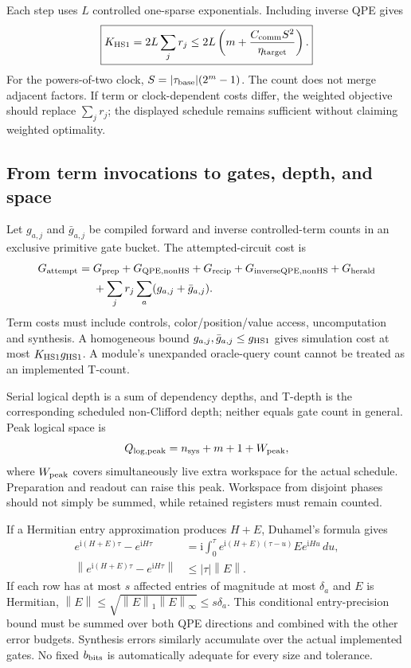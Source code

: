 \documentclass[11pt,a4paper]{article}
\newcommand{\norm}[1]{\left\lVert #1\right\rVert}
\newcommand{\C}{C_{\mathrm{comm}}}
\newcommand{\HS}{K_{\mathrm{HS1}}}
\newcommand{\ip}{\mathrm{i}}
\begin{document}
Each step uses $L$ controlled one-sparse exponentials. Including inverse QPE gives
\begin{equation}\label{eq:count}
 \boxed{\HS=2L\sum_jr_j\leq2L\left(m+\frac{\C S^2}{\eta_{\rm target}}\right).}
\end{equation}
For the powers-of-two clock, $S=|\tau_{\rm base}|(2^m-1)$. The count does not merge adjacent factors. If term or clock-dependent costs differ, the weighted objective should replace $\sum_jr_j$; the displayed schedule remains sufficient without claiming weighted optimality.

\subsection{From term invocations to gates, depth, and space}
Let $g_{a,j}$ and $\bar g_{a,j}$ be compiled forward and inverse controlled-term counts in an exclusive primitive gate bucket. The attempted-circuit cost is
\begin{align}
 G_{\rm attempt}={}&G_{\rm prep}+G_{\rm QPE,nonHS}+G_{\rm recip}
 +G_{\rm inverseQPE,nonHS}+G_{\rm herald}\nonumber\\
 &+\sum_jr_j\sum_a(g_{a,j}+\bar g_{a,j}).
\end{align}
Term costs must include controls, color/position/value access, uncomputation and synthesis. A homogeneous bound $g_{a,j},\bar g_{a,j}\leq g_{\rm HS1}$ gives simulation cost at most $\HS g_{\rm HS1}$. A module's unexpanded oracle-query count cannot be treated as an implemented T-count.

Serial logical depth is a sum of dependency depths, and T-depth is the corresponding scheduled non-Clifford depth; neither equals gate count in general. Peak logical space is
\begin{equation}
 Q_{\rm log,peak}=n_{\rm sys}+m+1+W_{\rm peak},
\end{equation}
where $W_{\rm peak}$ covers simultaneously live extra workspace for the actual schedule. Preparation and readout can raise this peak. Workspace from disjoint phases should not simply be summed, while retained registers must remain counted.

If a Hermitian entry approximation produces $H+E$, Duhamel's formula gives
\begin{align}
 e^{\ip(H+E)\tau}-e^{\ip H\tau}
 &=\ip\int_0^\tau e^{\ip(H+E)(\tau-u)}E e^{\ip Hu}\,du,\\
 \norm{e^{\ip(H+E)\tau}-e^{\ip H\tau}}&\leq|\tau|\norm E.
\end{align}
If each row has at most $s$ affected entries of magnitude at most $\delta_a$ and $E$ is Hermitian, $\norm E\leq\sqrt{\norm E_1\norm E_\infty}\leq s\delta_a$. This conditional entry-precision bound must be summed over both QPE directions and combined with the other error budgets. Synthesis errors similarly accumulate over the actual implemented gates. No fixed $b_{\rm bits}$ is automatically adequate for every size and tolerance.
\end{document}

